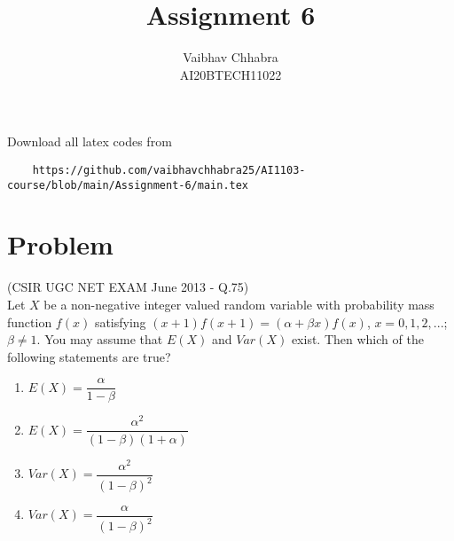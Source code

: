 \documentclass[journal,12pt,twocolumn]{IEEEtran}
\begin{document}
     \def\topbox#1{\raisebox{-\baselineskip}[0in][0in]{#1}}
     \def\midbox#1{\raisebox{-0.5\baselineskip}[0in][0in]{#1}}
\vspace{3cm}
\title{Assignment 6}
\author{Vaibhav Chhabra \\ AI20BTECH11022}
\maketitle
\newpage
\bigskip
\renewcommand{\thefigure}{\theenumi}
\renewcommand{\thetable}{\theenumi}
Download all latex codes from 
\begin{lstlisting}
    https://github.com/vaibhavchhabra25/AI1103-course/blob/main/Assignment-6/main.tex
\end{lstlisting}
\section{Problem}
(CSIR UGC NET EXAM June 2013 - Q.75)\\
Let $X$ be a non-negative integer valued random variable with probability mass function $f(x)$ satisfying $(x+1)f(x+1)=(\alpha + \beta x)f(x)$, $x=0,1,2,...$; $\beta \neq 1$. You may assume that $E(X)$ and $Var(X)$ exist. Then which of the following statements are true?
\vspace{0.2cm}
\begin{enumerate}
    \item $E(X)=\dfrac{\alpha}{1-\beta}$ \vspace{0.2cm}
    \item $E(X)=\dfrac{\alpha^2}{(1-\beta)(1+\alpha)}$ \vspace{0.2cm}
    \item $Var(X)=\dfrac{\alpha^2}{(1-\beta)^2}$ \vspace{0.2cm}
    \item $Var(X)=\dfrac{\alpha}{(1-\beta)^2}$
\end{enumerate}
\end{document}
